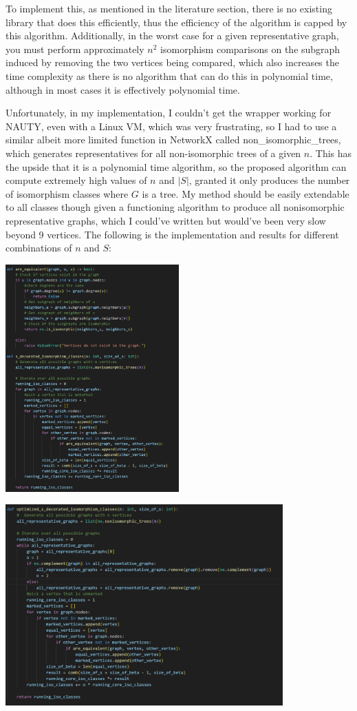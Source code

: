 \documentclass[11pt,reqno]{amsart}
\theoremstyle{definition}
\begin{document}
To implement this, as mentioned in the literature section, there is no existing library that does this efficiently, thus the efficiency of the algorithm is capped by this algorithm. Additionally, in the worst case for a given representative graph, you must perform approximately $n^2$ isomorphism comparisons on the subgraph induced by removing the two vertices being compared, which also increases the time complexity as there is no algorithm that can do this in polynomial time, although in most cases it is effectively polynomial time.

Unfortunately, in my implementation, I couldn't get the wrapper working for NAUTY, even with a Linux VM, which was very frustrating, so I had to use a similar albeit more limited function in NetworkX called non\_isomorphic\_trees, which generates representatives for all non-isomorphic trees of a given $n$. This has the upside that it is a polynomial time algorithm, so the proposed algorithm can compute extremely high values of $n$ and $|S|$, granted it only produces the number of isomorphism classes where $G$ is a tree. My method should be easily extendable to all classes though given a functioning algorithm to produce all nonisomorphic representative graphs, which I could've written but would've been very slow beyond 9 vertices. The following is the implementation and results for different combinations of $n$ and $S$:

\includegraphics[width=0.5\textwidth]{basefunctions.png}

\includegraphics[width=0.8\textwidth]{optimizedfunction.png}
\end{document}
